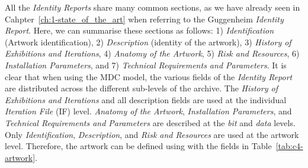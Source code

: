 All the \textit{Identity Reports} share many common sections, as we have already seen in Cahpter~\ref{ch:1-state_of_the_art} when referring to the Guggenheim \textit{Identity Report}. Here, we can summarise these sections as follows: 1) \textit{Identification} (Artwork identification), 2) \textit{Description} (identity of the artwork), 3) \textit{History of Exhibitions and Iterations}, 4) \textit{Anatomy of the Artwork}, 5) \textit{Risk and Resources}, 6) \textit{Installation Parameters}, and 7) \textit{Technical Requirements and Parameters}. It is clear that when using the MDC model, the various fields of the \textit{Identity Report} are distributed across the different sub-levels of the archive. The \textit{History of Exhibitions and Iterations} and all description fields are used at the individual \textit{Iteration File} (IF) level. \textit{Anatomy of the Artwork}, \textit{Installation Parameters}, and \textit{Technical Requirements and Parameters} are described at the \textit{bit} and \textit{data} levels. Only \textit{Identification}, \textit{Description}, and \textit{Risk and Resources} are used at the artwork level. Therefore, the artwork can be defined using with the fields in Table~\ref{tab:c4-artwork}.

